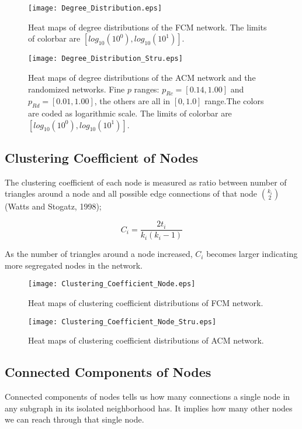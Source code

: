 \documentclass[12pt]{article}
\begin{document}
\begin{figure}[htp!]
	\centering
	\texttt{[image: Degree\_Distribution.eps]}
	\caption{Heat maps of degree distributions of the FCM network. The limits of colorbar are $[log_{10}(10^0), log_{10}(10^1)]$.}
\end{figure}

\newpage

\begin{figure}[h!]
	\centering
	\texttt{[image: Degree\_Distribution\_Stru.eps]}
	\caption{Heat maps of degree distributions of the ACM network and the randomized networks. Fine $p$ ranges: $p_{Rc}=[0.14 , 1.00]$ and $p_{Rd}=[0.01 , 1.00]$, the others are all in $[0,1.0]$ range.The colors are coded as logarithmic scale. The limits of colorbar are $[log_{10}(10^0), log_{10}(10^1)]$. }
\end{figure}

\newpage

\subsection{Clustering Coefficient of Nodes}

The clustering coefficient of each node is measured as ratio between number of triangles around a node and all possible edge connections of that node ${k_i \choose 2} $ (Watts and Stogatz, 1998); 

\begin{equation}
C_i =  \frac{2t_i}{k_i(k_i -1)}
\end{equation}

As the number of triangles around a node increased, $C_i$ becomes larger indicating more segregated nodes in the network.


\begin{figure}[h!]
	\centering
	\texttt{[image: Clustering\_Coefficient\_Node.eps]}
	\caption{Heat maps of clustering coefficient distributions of FCM network.}
\end{figure}

\newpage

\begin{figure}[h!]
	\centering
	\texttt{[image: Clustering\_Coefficient\_Node\_Stru.eps]}
	\caption{Heat maps of clustering coefficient distributions of ACM network.}
\end{figure}

\newpage

\subsection{Connected Components of Nodes}
Connected components of nodes tells us how many connections a single node in any subgraph in its isolated neighborhood has. It implies how many other nodes we can reach through that single node. 
\end{document}
